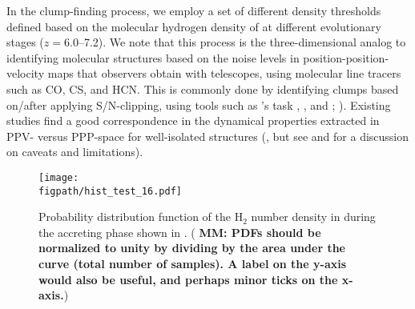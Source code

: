 \IfFileExists{emulateapjlegacy.cls}{\documentclass[iop]{emulateapjlegacy}}{\documentclass[iop]{emulateapj}}
\newcommand{\MM}[1]{({\bf \color{mmcolor} MM: #1})}
\def\figpath{./Fig}
\begin{document}
In the clump-finding process, we employ a set of different density
thresholds defined based on the molecular hydrogen density of \flower
at different evolutionary stages ($z=6.0$--7.2).
%
We note that this process is 
    the three-dimensional analog
to identifying molecular structures based on the noise levels 
     in position-position-velocity maps that
observers obtain with telescopes, using molecular line tracers such as
CO, CS, and HCN.
     This is commonly done by 
identifying clumps based on/after applying S/N-clipping, using tools such as 's task , , and ; \citealt{Williams94a, Oka01a, Rosolowsky06a, Rosolowsky08a}).
%
Existing studies find a good correspondence in the dynamical
properties extracted in PPV- versus PPP-space 
   for well-isolated structures 
(\citealt{Ballesteros-Paredes02a, Heitsch09a, Shetty10a, Beaumont13a, Pan15a}, but see
    \citealt{Ballesteros-Paredes02a} and 
\citealt{Shetty10a} for a discussion on caveats and limitations).

\begin{figure}[htbp]
\centering
\texttt{[image: \\figpath/hist\_test\_16.pdf]}
\caption{Probability distribution function of the H$_2$ number density
  in \flower during the accreting phase shown in . \MM{PDFs should be normalized to unity by dividing by the
    area under the curve (total number of samples).  A label on the
    y-axis would also be useful, and perhaps minor ticks on the x-axis.}
\label{fig:h2density}}
\end{figure}
\end{document}
